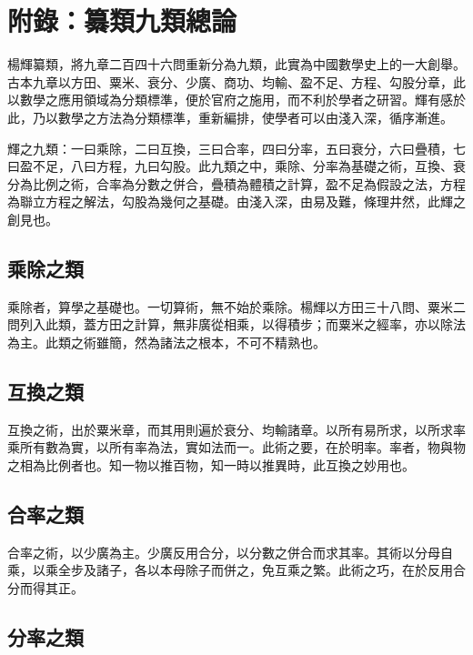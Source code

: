 \documentclass[11pt,a4paper]{article}
\begin{document}
\newpage

\section*{附錄：纂類九類總論}

楊輝纂類，將九章二百四十六問重新分為九類，此實為中國數學史上的一大創舉。古本九章以方田、粟米、衰分、少廣、商功、均輸、盈不足、方程、勾股分章，此以數學之應用領域為分類標準，便於官府之施用，而不利於學者之研習。輝有感於此，乃以數學之方法為分類標準，重新編排，使學者可以由淺入深，循序漸進。

輝之九類：一曰乘除，二曰互換，三曰合率，四曰分率，五曰衰分，六曰疊積，七曰盈不足，八曰方程，九曰勾股。此九類之中，乘除、分率為基礎之術，互換、衰分為比例之術，合率為分數之併合，疊積為體積之計算，盈不足為假設之法，方程為聯立方程之解法，勾股為幾何之基礎。由淺入深，由易及難，條理井然，此輝之創見也。

\subsection*{乘除之類}

乘除者，算學之基礎也。一切算術，無不始於乘除。楊輝以方田三十八問、粟米二問列入此類，蓋方田之計算，無非廣從相乘，以得積步；而粟米之經率，亦以除法為主。此類之術雖簡，然為諸法之根本，不可不精熟也。

\subsection*{互換之類}

互換之術，出於粟米章，而其用則遍於衰分、均輸諸章。以所有易所求，以所求率乘所有數為實，以所有率為法，實如法而一。此術之要，在於明率。率者，物與物之相為比例者也。知一物以推百物，知一時以推異時，此互換之妙用也。

\subsection*{合率之類}

合率之術，以少廣為主。少廣反用合分，以分數之併合而求其率。其術以分母自乘，以乘全步及諸子，各以本母除子而併之，免互乘之繁。此術之巧，在於反用合分而得其正。

\subsection*{分率之類}
\end{document}
